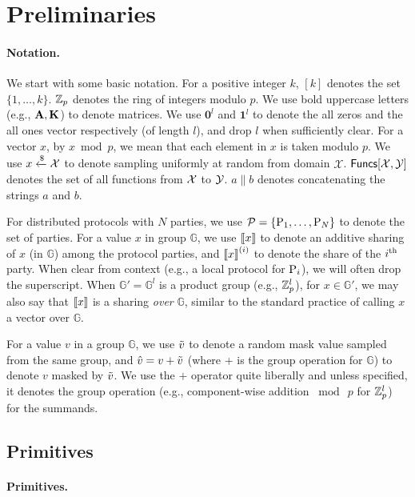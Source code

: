 
\section{Preliminaries}
\label{sec:preliminaries}

\paragraph{Notation.} We start with some basic notation.
For a positive integer $k$, $[k]$ denotes the set $\{1,\dots, k\}$. $\mathbb{Z}_p$ denotes the ring of integers modulo $p$. We use bold uppercase letters (e.g., $\mat{A}, \mat{K}$) to denote matrices. We use $\textbf{0}^l$ and $\textbf{1}^l$ to denote the all zeros and the all ones vector respectively (of length $l$), and drop $l$ when sufficiently clear. For a vector $x$, by $x \bmod p$, we mean that each element in $x$ is taken modulo $p$. We use $x \xleftarrow{\$} \mathcal{X}$ to denote sampling uniformly at random from domain $\mathcal{X}$. $\mathsf{Funcs}[\mathcal{X}, \mathcal{Y}]$ denotes the set of all functions from $\mathcal{X}$ to $\mathcal{Y}$. $a \parallel b$ denotes concatenating the strings $a$ and $b$.

For distributed protocols with $N$ parties, we use $\mathcal{P} = \{\textnormal{P}_1, \dots, \textnormal{P}_N\}$ to denote the set of parties. For a value $x$ in group $\mathbb{G}$, we use $\left\llbracket x \right\rrbracket$ to denote an additive sharing of $x$ (in $\mathbb{G}$) among the protocol parties, and $\left\llbracket x \right\rrbracket^{(i)}$ to denote the share of the $i^{\textnormal{th}}$ party. When clear from context (e.g., a local protocol for $\textnormal{P}_i$), we will often drop the superscript. When $\mathbb{G}' =  \mathbb{G}^l$ is a product group (e.g., $\mathbb{Z}_p^l$), for $x \in \mathbb{G}'$, we may also say that $\left\llbracket x \right\rrbracket$ is a sharing \textit{over} $\mathbb{G}$, similar to the standard practice of calling $x$ a vector over $\mathbb{G}$.

For a value $v$ in a group $\mathbb{G}$, we use $\tilde{v}$ to denote a random mask value sampled from the same group, and $\hat{v} = v + \tilde{v}$ (where + is the group operation for $\mathbb{G}$) to denote $v$ masked by $\tilde{v}$. We use the $+$ operator quite liberally and unless specified, it denotes the group operation (e.g., component-wise addition $\bmod~p$ for $\mathbb{Z}_p^l$) for the summands.


\iffull\subsection{Primitives}\else\paragraph{Primitives.}\fi


